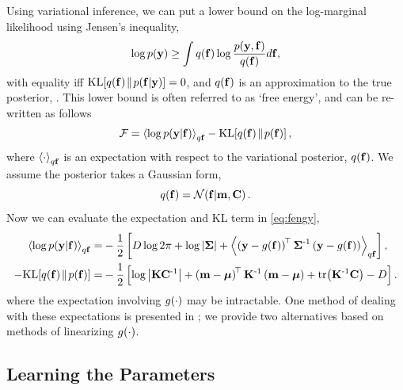 \documentclass{article} %
\begin{document}
Using variational inference, we can put a lower bound on the log-marginal
likelihood using Jensen's inequality, 
\begin{equation}
    \log p\!\left({\mathbf{y}}\right) \geq \int q\!\left({\mathbf{f}}\right) \log 
        \frac{p\!\left({\mathbf{y}, \mathbf{f}}\right)}{q\!\left({\mathbf{f}}\right)} d\mathbf{f},
\end{equation}
with equality iff $\text{KL}\!\left[{{q\!\left({\mathbf{f}}\right)}\!\parallel\!{p\!\left({\mathbf{f}}\middle\vert{\ensuremath{\mathbf{y}}}\right)}}\right] = 0$, and
$q\!\left({\mathbf{f}}\right)$ is an approximation to the true posterior,
\probC{\lstate}{\obs}. This lower bound is often referred to as `free energy',
and can be re-written as follows
\begin{equation}
    \mathcal{F} = \left\langle{\log \ensuremath{p\!\left({\mathbf{y}}\middle\vert{\ensuremath{\mathbf{f}}}\right)}}\right\rangle_{q\mathbf{f}}
        - \text{KL}\!\left[{{q\!\left({\mathbf{f}}\right)}\!\parallel\!{p\!\left({\mathbf{f}}\right)}}\right],
    \label{eq:fengy}
\end{equation}
where $\left\langle{\cdot}\right\rangle_{q\mathbf{f}}$ is an expectation with respect to the
variational posterior, $q\!\left({\mathbf{f}}\right)$. We assume the posterior takes a
Gaussian form,
\begin{equation}
    q\!\left({\mathbf{f}}\right) = \mathcal{N}\!\left({\mathbf{f}}\middle\vert{\ensuremath{\mathbf{m}}, \ensuremath{\mathbf{C}}}\right). \label{eq:varpost}
\end{equation}
Now we can evaluate the expectation and KL term in \eqref{eq:fengy},
\begin{align}
    \expec{q\lstate}{\log \probC{\obs}{\lstate}}
        =& - \frac{1}{2} \sbrac{ 
            D\log{2\pi} + \log\deter{\lcov} 
            + \expec{q\lstate}{\brac{\obs - \nonlin{\lstate}}\transpose\lcov\inv
            \brac{\obs - \nonlin{\lstate}}}},
            \label{eq:qlike} \\
     - \KL{\qrob{\lstate}}{\prob{\lstate}}
        =& - \frac{1}{2} \sbrac{\log\deter{\prcov\pocov\inv}
            + \brac{\pomean - \prmean}\transpose\prcov\inv
            \brac{\pomean - \prmean}
            + \trace{\prcov\inv\pocov} - D } \label{eq:qkl}.
\end{align}
where the expectation involving $g\!\left({{\cdot}}\right)$ may be intractable. One method
of dealing with these expectations is presented in \cite{Opper2009}; we provide
two alternatives based on methods of linearizing $g\!\left({{\cdot}}\right)$.


\subsection{Learning the Parameters}
\end{document}
